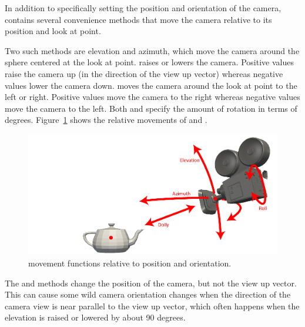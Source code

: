 In addition to specifically setting the position and orientation of the
camera,  contains several convenience methods that
move the camera relative to its position and look at point.



Two such methods are elevation and azimuth, which move the camera around
the sphere centered at the look at point.  raises or
lowers the camera. Positive values raise the camera up (in the direction of
the view up vector) whereas negative values lower the camera down.
 moves the camera around the look at point to the left or
right. Positive values move the camera to the right whereas negative values
move the camera to the left. Both  and
 specify the amount of rotation in terms of degrees.
Figure~\ref{fig:CameraMovement} shows the relative movements of
 and .

\begin{figure}[htb]
  \centering
  \includegraphics{images/CameraMovement}
  \caption{ movement functions relative to position
    and orientation.}
  \label{fig:CameraMovement}
\end{figure}


\begin{commonerrors}
  The  and  methods change the
  position of the camera, but not the view up vector. This can cause some
  wild camera orientation changes when the direction of the camera view is
  near parallel to the view up vector, which often happens when the
  elevation is raised or lowered by about 90 degrees.
\end{commonerrors}

